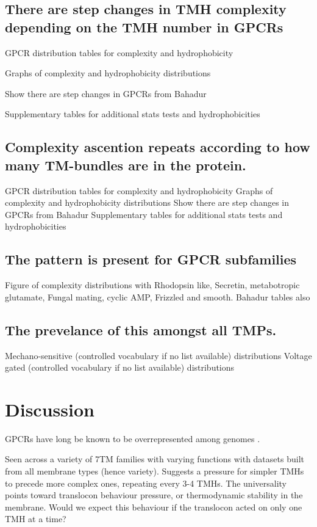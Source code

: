 \subsection{There are step changes in TMH complexity depending on the TMH number in GPCRs}
GPCR distribution tables for complexity and hydrophobicity

Graphs of complexity and hydrophobicity distributions

Show there are step changes in GPCRs from Bahadur

Supplementary tables for additional stats tests and hydrophobicities

\subsection{Complexity ascention repeats according to how many TM-bundles are in the protein.}
GPCR distribution tables for complexity and hydrophobicity
Graphs of complexity and hydrophobicity distributions
Show there are step changes in GPCRs from Bahadur
Supplementary tables for additional stats tests and hydrophobicities


\subsection{The pattern is present for GPCR subfamilies}
Figure of complexity distributions with Rhodopsin like, Secretin, metabotropic glutamate, Fungal mating, cyclic AMP, Frizzled and smooth.
Bahadur tables also


\subsection{The prevelance of this amongst all TMPs.}
Mechano-sensitive (controlled vocabulary if no list available) distributions
Voltage gated (controlled vocabulary if no list available) distributions


\section{Discussion}
GPCRs have long be known to be overrepresented among genomes \cite{Remm2000}.

Seen across a variety of 7TM families with varying functions with datasets built from all membrane types (hence variety).
Suggests a pressure for simpler TMHs to precede more complex ones, repeating every 3-4 TMHs.
The universality points toward translocon behaviour pressure, or thermodynamic stability in the membrane.
Would we expect this behaviour if the translocon acted on only one TMH at a time?
